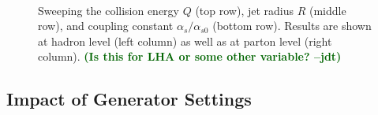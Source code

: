 \documentclass[11pt,letterpaper]{article}
\newcommand{\jdt}[1]{\textbf{\textcolor{darkgreen}{(#1 --jdt)}}}
\begin{document}
\begin{figure}
{\label{fig:sweep_as_hadron}
}
$\quad$
\caption{Sweeping the collision energy $Q$ (top row), jet radius $R$ (middle row), and coupling constant $\alpha_s/\alpha_{s0}$ (bottom row).  Results are shown at hadron level (left column) as well as at parton level (right column).  \jdt{Is this for LHA or some other variable?}}
\label{fig:ee_sweep}
\end{figure}

\subsection{Impact of Generator Settings}
\end{document}
